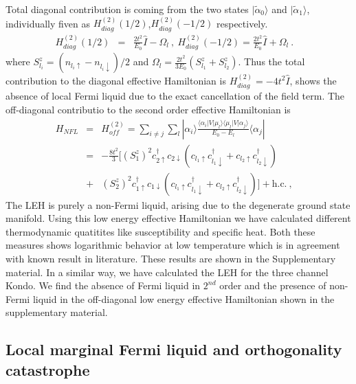 \documentclass[reprint,prb,superscriptaddress]{revtex4-2}
\begin{document}
Total diagonal contribution is coming from the two states $|\tilde{\alpha}_0\rangle$ and $|\tilde{\alpha}_1\rangle$, individually fiven as $H^{(2)}_{diag} (1/2)$,$H^{(2)}_{diag} (-1/2)$ respectively.
\begin{eqnarray}
H^{(2)}_{diag} (1/2) &=& \frac{2t^2}{E_0} \hat{I} - \Omega_l~,~ H^{(2)}_{diag} (-1/2) = \frac{2t^2}{E_0} \hat{I} + \Omega_l ~.~~~~
\end{eqnarray}
where $S_{l_i}^z=(n_{l_i\uparrow}-n_{l_i\downarrow})/2$ and $\Omega_l=\frac{2t^2}{3E_0} ( S_{l_1}^z + S_{l_2}^z)$.  Thus the total contribution to the diagonal effective Hamiltonian is $H^{(2)}_{diag} = -4t^2 \hat{I}$, shows the absence of local Fermi liquid due to the exact cancellation of the field term.
The off-diagonal contributio to the second order effective Hamiltonian is 
\begin{eqnarray}
H_{NFL}&=&H^{(2)}_{off} = \sum_{i\neq j} \sum_l |\alpha_i\rangle \frac{\langle \alpha_i  | V| \mu_l \rangle \langle \mu_l  | V| \alpha_j \rangle}{E_0-E_{l}}\langle \alpha_j | \nonumber\\
&=& -\frac{8t^2}{3} [ (S_1^z)^2 c_{2\uparrow}^{\dagger}c_{2\downarrow}  (  c_{l_1\uparrow}c_{l_1\downarrow}^{\dagger} +  c_{l_2\uparrow}c_{l_2\downarrow}^{\dagger}  ) \nonumber\\
&+& (S_2^z)^2 c_{1\uparrow}^{\dagger}c_{1\downarrow}  (  c_{l_1\uparrow}c_{l_1\downarrow}^{\dagger} +  c_{l_2\uparrow}c_{l_2\downarrow}^{\dagger}  ) ] + \textrm{h.c.} ~,~~~~
\label{eq:hamiltonian_NFL}
\end{eqnarray}
The LEH is purely a non-Fermi liquid, arising due to the degenerate ground state manifold. Using this low energy effective Hamiltonian we have calculated different thermodynamic quatitites like susceptibility and specific heat. Both these measures shows logarithmic behavior at low temperature which is in agreement with known result in literature. These results are shown in the Supplementary material. In a similar way, we have calculated the LEH for the three channel Kondo. We find the absence of Fermi liquid in $2^{nd}$ order and the presence of non-Fermi liquid in the off-diagonal low energy effective Hamiltonian shown in the supplementary material.

\subsection{Local marginal Fermi liquid and orthogonality catastrophe}
\label{sec:MFL}
\end{document}
